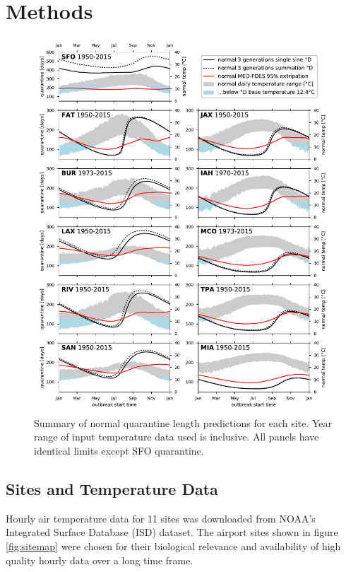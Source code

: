 \documentclass[10pt,a4paper,twocolumn]{article}
\begin{document}
\section*{Methods}


\begin{figure}[ht!] %
\centering
\includegraphics[width=1\textwidth]{figs/fig_main.pdf}
\caption{\label{fig:main_summary}Summary of normal quarantine length predictions for each site.
Year range of input temperature data used is inclusive.
All panels have identical limits except SFO quarantine.}
\end{figure}



\subsection*{Sites and Temperature Data}
Hourly air temperature data for 11 sites was downloaded from 
NOAA's Integrated Surface Database (ISD) dataset\cite{smith_integrated_2011,NOAA_ISD_portal}.
The airport sites shown in figure \ref{fig:sitemap} 
were chosen for their biological relevance and 
availability of high quality hourly data over a long time frame.
\end{document}
